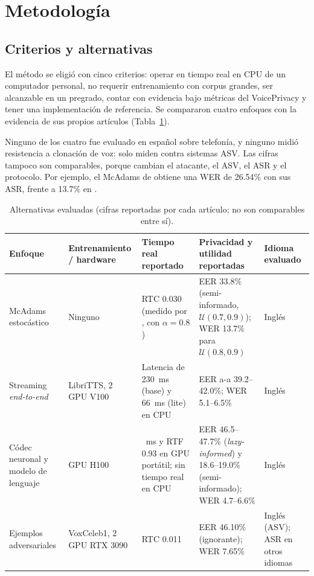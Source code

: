 \section{Metodología}

\subsection{Criterios y alternativas}
El método se eligió con cinco criterios: 
operar en tiempo real en CPU de un computador personal, 
no requerir entrenamiento con corpus grandes, 
ser alcanzable en un pregrado, 
contar con evidencia bajo métricas del VoicePrivacy y 
tener una implementación de referencia. 
Se compararon cuatro enfoques con la evidencia de sus propios artículos 
(Tabla~\ref{tab:alternativas}).

Ninguno de los cuatro fue evaluado en español sobre telefonía, 
y ninguno midió resistencia a clonación de voz: 
solo miden contra sistemas ASV. Las cifras tampoco son comparables, 
porque cambian el atacante, el ASV, el ASR y el protocolo. 
Por ejemplo, el McAdams de \textcite{deng2023} obtiene una WER de 26.54\% con sus ASR, 
frente a 13.7\% en \textcite{patino2021}.

\begin{table}[t]
  \centering
  \caption{Alternativas evaluadas (cifras reportadas por cada artículo; no son comparables entre sí).}
  \label{tab:alternativas}
  \small
  \renewcommand{\arraystretch}{1.2}
  \begin{tabularx}{\textwidth}{%
      >{\raggedright\arraybackslash}p{3.6cm}
      >{\raggedright\arraybackslash}p{3.0cm}
      >{\raggedright\arraybackslash}X
      >{\raggedright\arraybackslash}X
      >{\raggedright\arraybackslash}p{2.4cm}}
    \toprule
    Enfoque & Entrenamiento / hardware & Tiempo real reportado & Privacidad y utilidad reportadas & Idioma evaluado \\
    \midrule
    McAdams estocástico \parencite{patino2021}
      & Ninguno
      & RTC 0.030 (medido por \textcite{deng2023}, con $\alpha = 0.8$)
      & EER 33.8\% (semi-informado, $\mathcal{U}(0.7,0.9)$); WER 13.7\% para $\mathcal{U}(0.8,0.9)$
      & Inglés \\
    Streaming \textit{end-to-end} \parencite{quamer2024}
      & LibriTTS, 2 GPU V100
      & Latencia de 230~ms (base) y 66~ms (lite) en CPU
      & EER a-a 39.2--42.0\%; WER 5.1--6.5\%
      & Inglés \\
    Códec neuronal y modelo de lenguaje \parencite{kuzmin2026}
      & 8 GPU H100
      & 180~ms y RTF 0.93 en GPU portátil; sin tiempo real en CPU
      & EER 46.5--47.7\% (\textit{lazy-informed}) y 18.6--19.0\% (semi-informado); WER 4.7--6.6\%
      & Inglés \\
    Ejemplos adversariales \parencite{deng2023}
      & VoxCeleb1, 2 GPU RTX 3090
      & RTC 0.011
      & EER 46.10\% (ignorante); WER 7.65\%
      & Inglés (ASV); ASR en otros idiomas \\
    \bottomrule
  \end{tabularx}
\end{table}

